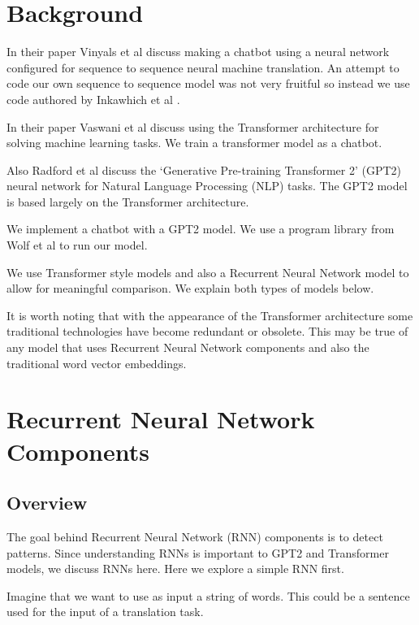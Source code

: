 
\section{Background}

In their paper Vinyals et al \cite{DBLP:journals/corr/VinyalsL15} discuss making a chatbot using a neural network configured for sequence to sequence neural machine translation. An attempt to code our own sequence to sequence model was not very fruitful so instead we use code authored by Inkawhich et al \cite{2018Inkawhich}.

In their paper Vaswani et al \cite{Vaswani2017AttentionIA} discuss using the Transformer architecture for solving machine learning tasks. We train a transformer model as a chatbot. %

Also Radford et al \cite{radford2019language} discuss the `Generative Pre-training Transformer 2' (GPT2) neural network for Natural Language Processing (\ac{NLP}) tasks. The GPT2 model is based largely on the Transformer architecture. 

We implement a chatbot with a GPT2 model. We use a program library from Wolf et al \cite{Wolf2019HuggingFacesTS} to run our model.

We use Transformer style models and also a Recurrent Neural Network model to allow for meaningful comparison. We explain both types of models below.

It is worth noting that with the appearance of the Transformer architecture some traditional technologies have become redundant or obsolete. This may be true of any model that uses Recurrent Neural Network components and also the traditional word vector embeddings.

\section{Recurrent Neural Network Components}

\subsection{Overview}
The goal behind Recurrent Neural Network (RNN) components is to detect patterns. Since understanding RNNs is important to GPT2 and Transformer models, we discuss RNNs here. Here we explore a simple \ac{RNN} first. 

Imagine that we want to use as input a string of words. This could be a sentence used for the input of a translation task.

